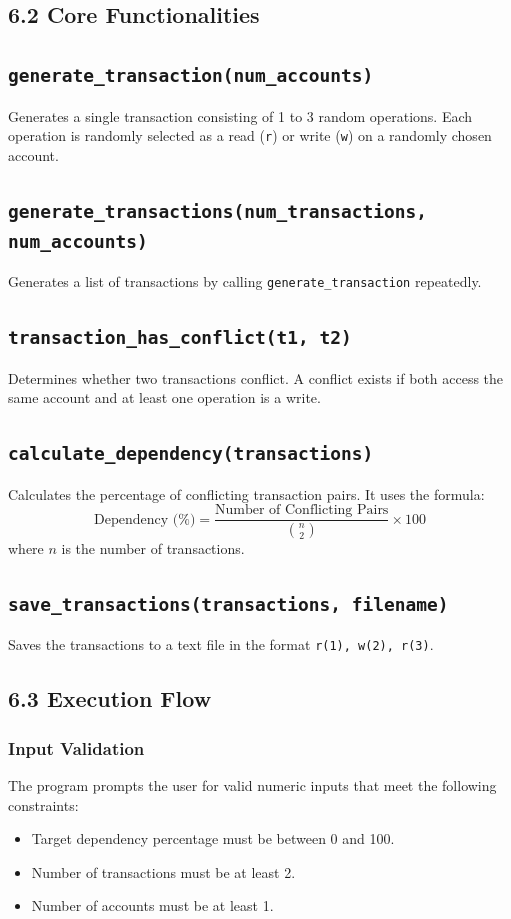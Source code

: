 \documentclass[12pt]{article}
\begin{document}
\subsection*{6.2 Core Functionalities}

\subsection*{\texttt{generate\_transaction(num\_accounts)}}
Generates a single transaction consisting of 1 to 3 random operations. Each operation is randomly selected as a read (\texttt{r}) or write (\texttt{w}) on a randomly chosen account.

\subsection*{\texttt{generate\_transactions(num\_transactions, num\_accounts)}}
Generates a list of transactions by calling \texttt{generate\_transaction} repeatedly.

\subsection*{\texttt{transaction\_has\_conflict(t1, t2)}}
Determines whether two transactions conflict. A conflict exists if both access the same account and at least one operation is a write.

\subsection*{\texttt{calculate\_dependency(transactions)}}
Calculates the percentage of conflicting transaction pairs. It uses the formula:
\[
\text{Dependency (\%)} = \frac{\text{Number of Conflicting Pairs}}{\binom{n}{2}} \times 100
\]
where $n$ is the number of transactions.

\subsection*{\texttt{save\_transactions(transactions, filename)}}
Saves the transactions to a text file in the format \texttt{r(1), w(2), r(3)}.

\subsection*{6.3 Execution Flow}

\subsubsection*{Input Validation}
The program prompts the user for valid numeric inputs that meet the following constraints:
\begin{itemize}
    \item Target dependency percentage must be between 0 and 100.
    \item Number of transactions must be at least 2.
    \item Number of accounts must be at least 1.
\end{itemize}
\end{document}
